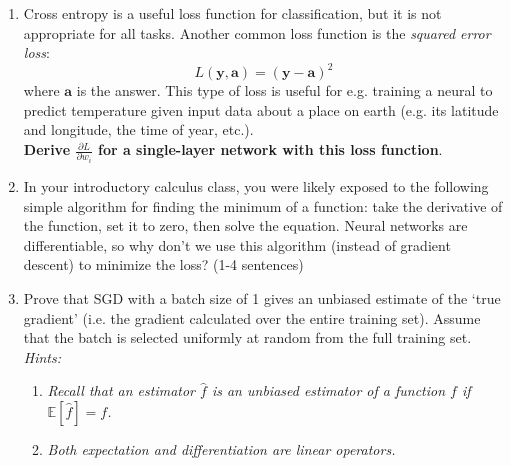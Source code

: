 \documentclass{article}
\begin{document}
\begin{enumerate}

    \item Cross entropy is a useful loss function for classification, but it is not appropriate for all tasks. Another common loss function is the \emph{squared error loss}:
    \begin{equation*}
        L(\mathbf{y}, \mathbf{a}) = (\mathbf{y} - \mathbf{a})^2
    \end{equation*}
   where $\mathbf{a}$ is the answer. This type of loss is useful for e.g. training a neural to predict temperature given input data about a place on earth (e.g. its latitude and longitude, the time of year, etc.).\\
    \textbf{Derive $\frac{\partial L}{\partial w_{i}}$ for a single-layer network with this loss function}.

    \item In your introductory calculus class, you were likely exposed to the following simple algorithm for finding the minimum of a function: take the derivative of the function, set it to zero, then solve the equation. Neural networks are differentiable, so why don't we use this algorithm (instead of gradient descent) to minimize the loss? (1-4 sentences)
    
    \item Prove that SGD with a batch size of 1 gives an unbiased estimate of the `true gradient' (i.e. the gradient calculated over the entire training set). Assume that the batch is selected uniformly at random from the full training set.\\
    \textit{Hints:}
    \begin{enumerate}
        \item \textit{Recall that an estimator $\hat{f}$ is an unbiased estimator of a function $f$ if $\mathbb{E}[\hat{f}] = f$.}
        \item \textit{Both expectation and differentiation are linear operators.}
        
    \end{enumerate}
    
\end{enumerate}
\end{document}

